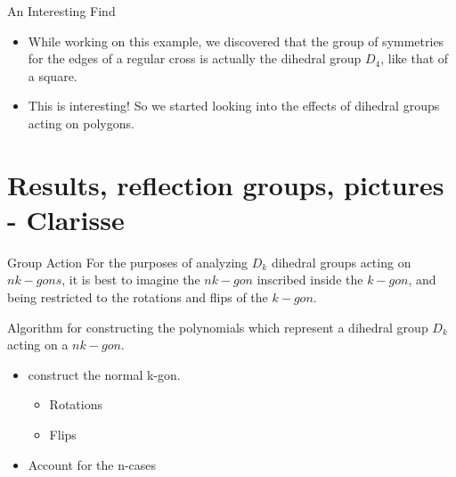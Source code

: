 \documentclass{beamer}
\begin{document}
\begin{frame}{An Interesting Find}
\begin{itemize}
\item While working on this example, we discovered that the group of symmetries for the edges of a regular cross is actually the dihedral group $D_4$, like that of a square.
\item This is interesting! So we started looking into the effects of dihedral groups acting on polygons.
\end{itemize}
\end{frame}


\section{Results, reflection groups, pictures - Clarisse}
\begin{frame}{Group Action}
For the purposes of analyzing $D_k$ dihedral groups acting on $nk-gons$, it is best to imagine the $nk-gon$ inscribed inside the $k-gon$, and being restricted to the rotations and flips of the $k-gon$.\\
\end{frame}

\begin{frame}{Algorithm for constructing the polynomials  which represent a dihedral group $D_k$ acting on a $nk-gon$.}
	\begin{itemize}
    	\item construct the normal k-gon.
        	\begin{itemize}
            	\item Rotations
                \item Flips
             \end{itemize}
        \item Account for the n-cases
    \end{itemize}
\end{frame}
\end{document}
